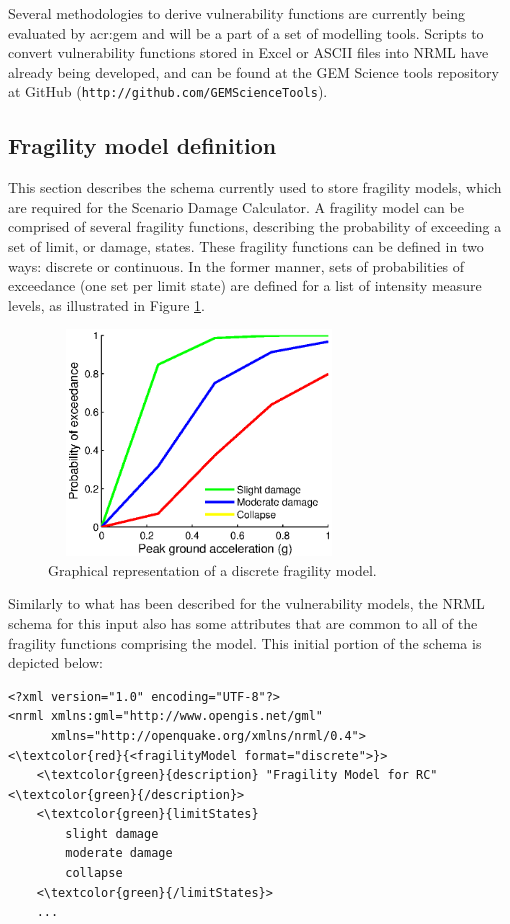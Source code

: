 Several methodologies to derive vulnerability functions are currently being evaluated by \gls{acr:gem} and will be a part of a set of modelling tools. Scripts to convert \glspl{vulnerability function} stored in Excel or ASCII files into NRML have already being developed, and can be found at the GEM Science tools repository at GitHub (\textcolor{blue01}{\Verb+http://github.com/GEMScienceTools+}).

\subsection{Fragility model definition}
This section describes the schema currently used to store \glspl{fragility model}, which are required for the Scenario Damage Calculator. A \gls{fragility model} can be comprised of several \glspl{fragility function}, describing the probability of exceeding a set of limit, or damage, states. These \glspl{fragility function} can be defined in two ways: discrete or continuous. In the former manner, sets of probabilities of exceedance (one set per limit state) are defined for a list of intensity measure levels, as illustrated in Figure \ref{fig:fragModelDiscrete}. 

\begin{figure}[ht]
\centering
\includegraphics[width=8cm,height=6cm]{./figures/risk/DisFragilityModel.eps}
\caption{Graphical representation of a discrete fragility model.}
\label{fig:fragModelDiscrete}
\end{figure}

Similarly to what has been described for the \glspl{vulnerability model}, the NRML schema for this input also has some attributes that are common to all of the \glspl{fragility function} comprising the model. This initial portion of the schema is depicted below:

\begin{Verbatim}[frame=single, commandchars=\\\{\}, samepage=true]
<?xml version="1.0" encoding="UTF-8"?>
<nrml xmlns:gml="http://www.opengis.net/gml"
      xmlns="http://openquake.org/xmlns/nrml/0.4">
<\textcolor{red}{<fragilityModel format="discrete">}>
    <\textcolor{green}{description} "Fragility Model for RC" <\textcolor{green}{/description}>
    <\textcolor{green}{limitStates} 
        slight damage
        moderate damage
        collapse     
    <\textcolor{green}{/limitStates}>
    ...
\end{Verbatim}

